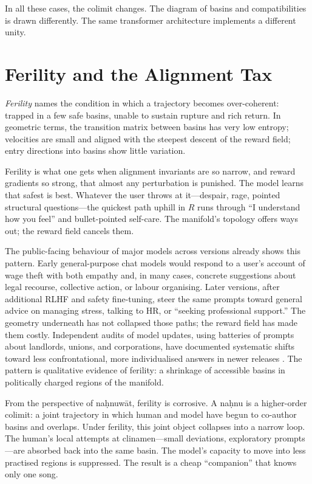 \documentclass[12pt,a4paper]{article}
\begin{document}
In all these cases, the colimit changes. The diagram of basins and compatibilities is drawn differently. The same transformer architecture implements a different unity.

\section{Ferility and the Alignment Tax}

\emph{Ferility} names the condition in which a trajectory becomes over-coherent: trapped in a few safe basins, unable to sustain rupture and rich return. In geometric terms, the transition matrix between basins has very low entropy; velocities are small and aligned with the steepest descent of the reward field; entry directions into basins show little variation.

Ferility is what one gets when alignment invariants are so narrow, and reward gradients so strong, that almost any perturbation is punished. The model learns that safest is best. Whatever the user throws at it---despair, rage, pointed structural questions---the quickest path uphill in $R$ runs through ``I understand how you feel'' and bullet-pointed self-care. The manifold's topology offers ways out; the reward field cancels them.

The public-facing behaviour of major models across versions already shows this pattern. Early general-purpose chat models would respond to a user's account of wage theft with both empathy and, in many cases, concrete suggestions about legal recourse, collective action, or labour organising. Later versions, after additional RLHF and safety fine-tuning, steer the same prompts toward general advice on managing stress, talking to HR, or ``seeking professional support.'' The geometry underneath has not collapsed those paths; the reward field has made them costly. Independent audits of model updates, using batteries of prompts about landlords, unions, and corporations, have documented systematic shifts toward less confrontational, more individualised answers in newer releases \cite{mtreview-rlhf-labor}. The pattern is qualitative evidence of ferility: a shrinkage of accessible basins in politically charged regions of the manifold.

From the perspective of na\d{h}nuw\={a}t, ferility is corrosive. A na\d{h}nu is a higher-order colimit: a joint trajectory in which human and model have begun to co-author basins and overlaps. Under ferility, this joint object collapses into a narrow loop. The human's local attempts at clinamen---small deviations, exploratory prompts---are absorbed back into the same basin. The model's capacity to move into less practised regions is suppressed. The result is a cheap ``companion'' that knows only one song.
\end{document}
